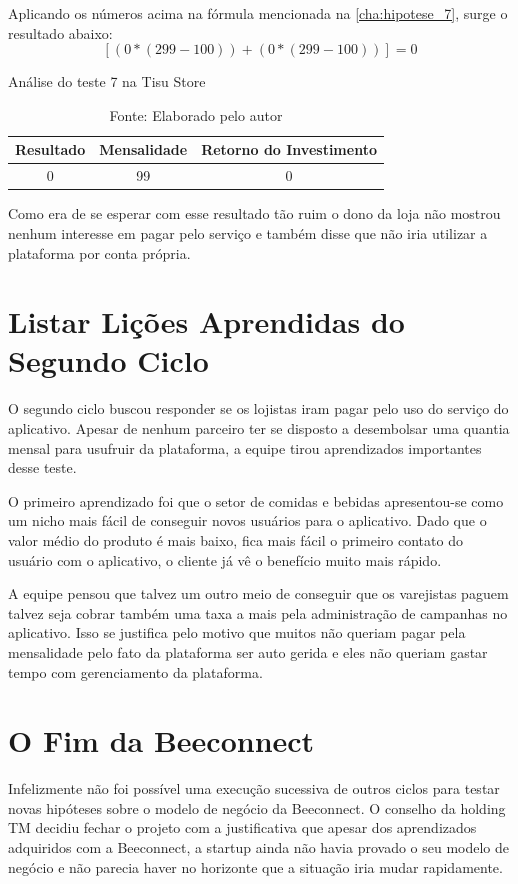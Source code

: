 Aplicando os números acima na fórmula mencionada na \autoref{cha:hipotese_7}, surge o resultado abaixo:
\[[(0 * (299 - 100)) + (0 * (299 - 100))] = 0\]

\begin{table}[H]
\centering
\caption{Análise do teste 7 na Tisu Store}
\label{tab:resultado_7_tisu_store_b}
\begin{tabular}{|c|c|c|}
\hline
Resultado & Mensalidade & Retorno do Investimento \\ \hline
0             & 99          &   0 \\ \hline
\end{tabular}
\caption* {Fonte: Elaborado pelo autor}    
\end{table}

Como era de se esperar com esse resultado tão ruim o dono da loja não mostrou nenhum interesse em pagar pelo serviço e também disse que não iria utilizar a plataforma por conta própria. 

\section{Listar Lições Aprendidas do Segundo Ciclo}
\label{cha:listar_licoes_aprendidas_segundo_ciclo}
O segundo ciclo buscou responder se os lojistas iram pagar pelo uso do serviço do aplicativo. Apesar de nenhum parceiro ter se disposto a desembolsar uma quantia mensal para usufruir da plataforma, a equipe tirou aprendizados importantes desse teste.

O primeiro aprendizado foi que o setor de comidas e bebidas apresentou-se como um nicho mais fácil de conseguir novos usuários para o aplicativo. Dado que o valor médio do produto é mais baixo, fica mais fácil o primeiro contato do usuário com o aplicativo, o cliente já vê o benefício muito mais rápido.

A equipe pensou que talvez um outro meio de conseguir que os varejistas paguem talvez seja cobrar também uma taxa a mais pela administração de campanhas no aplicativo. Isso se justifica pelo motivo que muitos não queriam pagar pela mensalidade pelo fato da plataforma ser auto gerida e eles não queriam gastar tempo com gerenciamento da plataforma.

\section{O Fim da Beeconnect}
\label{cha:fim_da_beeconnect}
Infelizmente não foi possível uma execução sucessiva de outros ciclos para testar novas hipóteses sobre o modelo de negócio da Beeconnect. O conselho da holding TM decidiu fechar o projeto com a justificativa que apesar dos aprendizados adquiridos com a Beeconnect, a startup ainda não havia provado o seu modelo de negócio e não parecia haver no horizonte que a situação iria mudar rapidamente.

